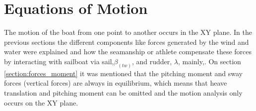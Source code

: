 \section{Equations of Motion}
The motion of the boat from one point to another occurs in the XY plane. In the previous sections the different components like forces generated by the wind and water were explained and how the seamanship or athlete compensate these forces by interacting with sailboat via sail,$\beta_(tw)$, and rudder, $\lambda$, mainly,. On section \ref{section:forces_moment} %
it was mentioned that the  pitching moment and sway forces (vertical forces) are always in equilibrium, which means that heave translation and pitching moment can be omitted and the motion analysis only occurs on the XY plane. \par 

